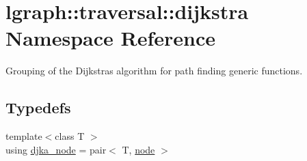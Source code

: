 \hypertarget{namespacelgraph_1_1traversal_1_1dijkstra}{}\section{lgraph\+:\+:traversal\+:\+:dijkstra Namespace Reference}
\label{namespacelgraph_1_1traversal_1_1dijkstra}


Grouping of the Dijkstra\textquotesingle{}s algorithm for path finding generic functions.  


\subsection*{Typedefs}
\begin{DoxyCompactItemize}
\item 
{\footnotesize template$<$class T $>$ }\\using \hyperlink{namespacelgraph_1_1traversal_1_1dijkstra_a06495bda19735564a02a6e98198a0980}{djka\+\_\+node} = pair$<$ T, \hyperlink{namespacelgraph_1_1utils_a7bd66ede3805ef121bc2835bd48de0cf}{node} $>$\hypertarget{namespacelgraph_1_1traversal_1_1dijkstra_a06495bda19735564a02a6e98198a0980}{}\label{namespacelgraph_1_1traversal_1_1dijkstra_a06495bda19735564a02a6e98198a0980}


\end{DoxyCompactItemize}
